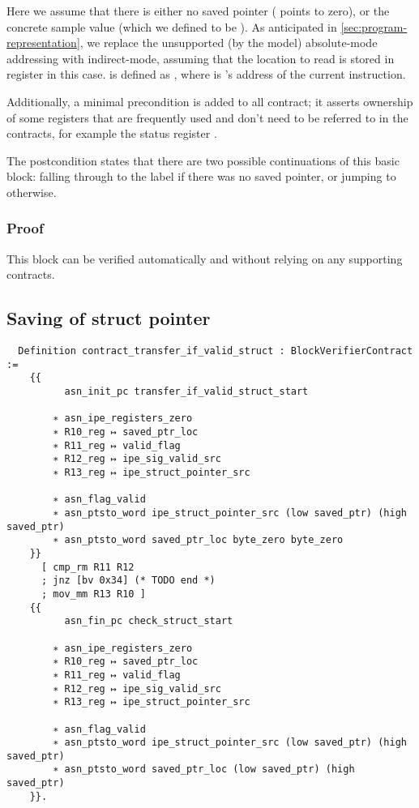 Here we assume that there is either no saved pointer ( points to zero), or the concrete sample value  (which we defined to be ). As anticipated in \cref{sec:program-representation}, we replace the unsupported (by the model) absolute-mode addressing with indirect-mode, assuming that the location to read is stored in register  in this case.  is defined as , where  is 's address of the current instruction.

Additionally, a minimal precondition is added to all contract; it asserts ownership of some registers that are frequently used and don't need to be referred to in the contracts, for example the status register .

The postcondition states that there are two possible continuations of this basic block: falling through to the  label if there was no  saved pointer, or jumping to  otherwise.

\subsubsection{Proof}

This block can be verified automatically and without relying on any supporting contracts.

\subsection{Saving of struct pointer}

\begin{verbatim}
  Definition contract_transfer_if_valid_struct : BlockVerifierContract :=
    {{
          asn_init_pc transfer_if_valid_struct_start

        ∗ asn_ipe_registers_zero
        ∗ R10_reg ↦ saved_ptr_loc
        ∗ R11_reg ↦ valid_flag
        ∗ R12_reg ↦ ipe_sig_valid_src
        ∗ R13_reg ↦ ipe_struct_pointer_src

        ∗ asn_flag_valid
        ∗ asn_ptsto_word ipe_struct_pointer_src (low saved_ptr) (high saved_ptr)
        ∗ asn_ptsto_word saved_ptr_loc byte_zero byte_zero
    }}
      [ cmp_rm R11 R12
      ; jnz [bv 0x34] (* TODO end *)
      ; mov_mm R13 R10 ]
    {{
          asn_fin_pc check_struct_start

        ∗ asn_ipe_registers_zero
        ∗ R10_reg ↦ saved_ptr_loc
        ∗ R11_reg ↦ valid_flag
        ∗ R12_reg ↦ ipe_sig_valid_src
        ∗ R13_reg ↦ ipe_struct_pointer_src

        ∗ asn_flag_valid
        ∗ asn_ptsto_word ipe_struct_pointer_src (low saved_ptr) (high saved_ptr)
        ∗ asn_ptsto_word saved_ptr_loc (low saved_ptr) (high saved_ptr)
    }}.
\end{verbatim}


